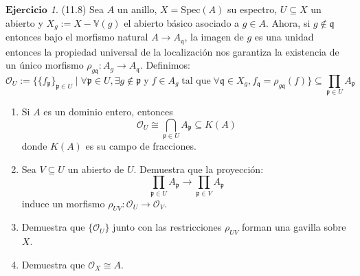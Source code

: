 \documentclass[10pt]{report}
\theoremstyle{plain}\newtheorem{thm}{Teorema}
\theoremstyle{plain}\newtheorem{lem}[thm]{Lema}
\theoremstyle{plain}\newtheorem*{conjecture*}{Conjetura}
\theoremstyle{plain}\newtheorem{cor}[thm]{Corolario}
\theoremstyle{definition}\newtheorem{defin}{Definici\'on}
\theoremstyle{definition}\newtheorem*{defin*}{Definici\'on}
\theoremstyle{remark}\newtheorem{claim}{Proposici\'on}
\theoremstyle{remark}\newtheorem*{claim*}{Proposici\'on}
\theoremstyle{remark}\newtheorem*{eje*}{$\mathbf{Ejercicio}$}
\theoremstyle{remark}\newtheorem{exa}{Ejemplo}
\newcommand{\p}{\mathfrak{p}} %
\newcommand{\q}{\mathfrak{q}} %
\newcommand{\OO}{\mathcal{O}} %
\newcommand{\spec}[1]{\text{Spec}(#1)}
\newcommand{\ra}{\rightarrow}
\begin{document}
\begin{comment}
Sea $f=a_n x^n+\cdots +a_0\in A[x]$ irreducible. Si $n=0$ entonces $f$ es irreducible en $A$ y as\'i es primo en $A$ y
acabamos. Ahora asumimos que $n>0$.

Si $K=\kappa(A)$ es el campo de fracciones de $A$, afirmamos que $f$, como elemento de $K[x]$, es irreducible. Si $f=g_1 g_2$
con $g_i \in K[x]$, podemos cancelar denominadores y reordenar los coeficientes para obtenener:
$f=\mu_1 g_1 \cdot \mu_2 g_2$ con $\mu_i\in A$ y $\mu_i g_i\in A[x]$. Esto es una contradicci\'on porque $f\in A[x]$ es
irreducible (aqu\'i estoy asumiendo que $f$ es primitivo, i.e. $(a_0,\ldots,a_0)=1$, para que el reordenamiento sea posible.
Si $f$ no fuese primitivo no ser\'ia irreducible). Como $f\in K[x]$ es irreducible, tambi\'en es primo
(ya que $K[x]$ es DFU por ser DIP).

Ahora probamos que $f\in A[x]$ es primo. Supongamos que $f\mid gh$ con $g,h\in A[x]$. Visto como una descomposici\'on en
$K[x]$ podemos asumir sin p\'erdida de generalidad que $f\mid g$ como polinomios de $K[x]$, es decir, existe un $g'\in K[x]$
tal que $fg'=g$. Si cancelamos denominadores y reordenamos los coeficientes (esto se puede porque $f$ es irreducible) obtenemos
una factorizaci\'on $f(\mu'g')=g$ como polinomios de $A[x]$. Por lo tanto $f\mid g$ en $A[x]$ y concluimos que $f$ es primo.
\end{proof}
\hline
\end{comment}


\begin{eje*}(11.8)
Sea $A$ un anillo, $X=\spec{A}$ su espectro, $U\subseteq X$ un abierto y $X_g:=X-\mathbb{V}(g)$ el abierto b\'asico asociado
a $g\in A$. Ahora, si $g\not\in\q$ entonces bajo el morfismo natural $A\ra A_{\q}$, la imagen de $g$ es una unidad entonces
la propiedad universal de la localizaci\'on nos garantiza la existencia de un \'unico morfismo $\rho_{g\q}:A_g\ra A_{\q}$.
Definimos:
\[
	\OO_U:=\{ \{f_{\p}\}_{\p\in U} \mid \forall \p\in U, \exists g\not\in\p\;\text{y}\; f\in A_g\;\text{tal que}\;
	\forall \q\in X_g, f_{\q}=\rho_{g\q}(f)\}\subseteq \prod_{\p\in U}A_{\p}
\]
\begin{enumerate}

	\item Si $A$ es un dominio entero, entonces $$\OO_U\cong \bigcap_{\p\in U} A_{\p}\subseteq K(A)$$ donde $K(A)$ es su
	campo de fracciones.
	
	\item Sea $V\subseteq U$ un abierto de $U$. Demuestra que la proyecci\'on:
	$$\prod_{\p\in U} A_{\p} \ra \prod_{\p\in V} A_{\p}$$ induce un morfismo $\rho_{UV}:\OO_U \ra \OO_V$.
	
	\item Demuestra que $\{\OO_U\}$ junto con las restricciones $\rho_{UV}$ forman una gavilla sobre $X$.
 	
	\item Demuestra que $\OO_X\cong A$.
\end{enumerate}
\end{eje*}
\end{document}
